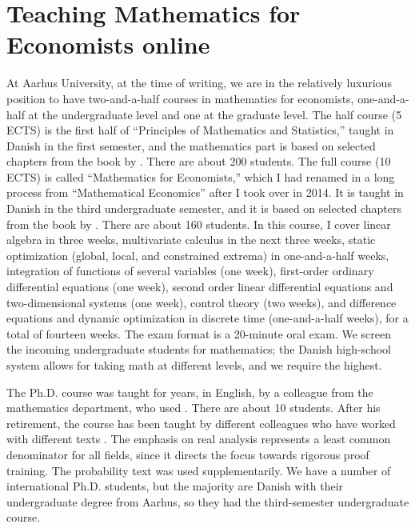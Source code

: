 \documentclass[graybox]{svmult}
\begin{document}
\section{Teaching Mathematics for Economists online}
\label{sec:3}
At Aarhus University, at the time of writing, we are in the relatively luxurious position to have two-and-a-half courses in mathematics for economists, one-and-a-half at the undergraduate level and one at the graduate level. The half course (5 ECTS) is the first half of ``Principles of Mathematics and Statistics,'' taught in Danish in the first semester, and the mathematics part is based on selected chapters from the book by \cite{Sydsaeter2022}. There are about 200 students. The full course (10 ECTS) is called ``Mathematics for Economists,'' which I had renamed in a long process from ``Mathematical Economics'' after I took over in 2014. It is taught in Danish in the third undergraduate semester, and it is based on selected chapters from the book by \cite{Sydsaeter2008}. There are about 160 students. In this course, I cover linear algebra in three weeks, multivariate calculus in the next three weeks, static optimization (global, local, and constrained extrema) in one-and-a-half weeks, integration of functions of several variables (one week), first-order ordinary differential equations (one week), second order linear differential equations and two-dimensional systems (one week), control theory (two weeks), and difference equations and dynamic optimization in discrete time (one-and-a-half weeks), for a total of fourteen weeks. The exam format is a 20-minute oral exam. We screen the incoming undergraduate students for mathematics; the Danish high-school system allows for taking math at different levels, and we require the highest.

The Ph.D. course was taught for years, in English, by a colleague from the mathematics department, who used \cite{Rudin1976}. There are about 10 students. After his retirement, the course has been taught by different colleagues who have worked with different texts \citep{Boyd2004,Johnsonbaugh2010,Ok2007,Resnick2014}. The emphasis on real analysis represents a least common denominator for all fields, since it directs the focus towards rigorous proof training. The probability text was used supplementarily. We have a number of international Ph.D. students, but the majority are Danish with their undergraduate degree from Aarhus, so they had the third-semester undergraduate course.
\end{document}
